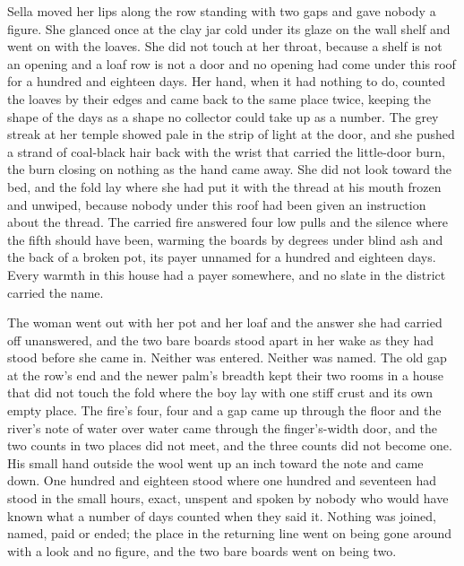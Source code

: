 Sella moved her lips along the row standing with two gaps and gave nobody a figure. She glanced once at the clay jar cold under its glaze on the wall shelf and went on with the loaves. She did not touch  at her throat, because a shelf is not an opening and a loaf row is not a door and no opening had come under this roof for a hundred and eighteen days. Her hand, when it had nothing to do, counted the loaves by their edges and came back to the same place twice, keeping the shape of the days as a shape no collector could take up as a number. The grey streak at her temple showed pale in the strip of light at the door, and she pushed a strand of coal-black hair back with the wrist that carried the little-door burn, the burn closing on nothing as the hand came away. She did not look toward the bed, and the fold lay where she had put it with the thread at his mouth frozen and unwiped, because nobody under this roof had been given an instruction about the thread. The carried fire answered four low pulls and the silence where the fifth should have been, warming the boards by degrees under blind ash and the back of a broken pot, its payer unnamed for a hundred and eighteen days. Every warmth in this house had a payer somewhere, and no slate in the district carried the name.

The woman went out with her pot and her loaf and the answer she had carried off unanswered, and the two bare boards stood apart in her wake as they had stood before she came in. Neither was entered. Neither was named. The old gap at the row's end and the newer palm's breadth kept their two rooms in a house that did not touch the fold where the boy lay with one stiff crust and its own empty place. The fire's four, four and a gap came up through the floor and the river's note of water over water came through the finger's-width door, and the two counts in two places did not meet, and the three counts did not become one. His small hand outside the wool went up an inch toward the note and came down. One hundred and eighteen stood where one hundred and seventeen had stood in the small hours, exact, unspent and spoken by nobody who would have known what a number of days counted when they said it. Nothing was joined, named, paid or ended; the place in the returning line went on being gone around with a look and no figure, and the two bare boards went on being two.
